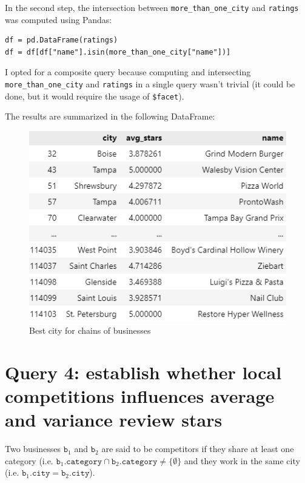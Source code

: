 \documentclass{Configuration_Files/PoliMi3i_thesis}
\begin{document}
In the second step, the intersection between \texttt{more\_than\_one\_city} and \texttt{ratings} was computed using Pandas:

\bigskip 

\begin{verbatim}
df = pd.DataFrame(ratings)
df = df[df["name"].isin(more_than_one_city["name"])]
\end{verbatim}

\bigskip

I opted for a composite query because computing and intersecting \texttt{more\_than\_one\_city} and \texttt{ratings} in a single query wasn't trivial (it could be done, but it would require the usage of \texttt{\$facet}).

The results are summarized in the following DataFrame:

\bigskip

\begin{figure}[H]
    \centering
    \includegraphics[width=2\columnwidth / 3]{imgs/query_4_table.png}
    \caption{Best city for chains of businesses}
    \label{fig:query_4}
\end{figure}

\bigskip

\section{Query 4: establish whether local competitions influences average and variance review stars}
Two businesses $\texttt{b}_1$ and $\texttt{b}_2$ are said to be competitors if they share at least one category (i.e. $\texttt{b}_1\texttt{.category} \cap \texttt{b}_2\texttt{.category} \neq \{\emptyset\}$ and they work in the same city (i.e. $\texttt{b}_1\texttt{.city} = \texttt{b}_2\texttt{.city}$). 
\end{document}
